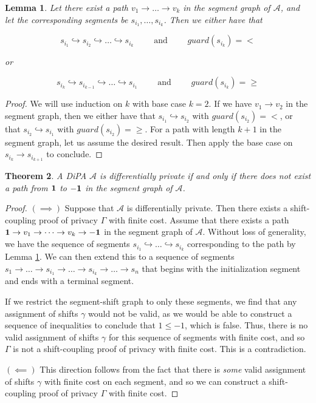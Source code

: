 \documentclass[12pt]{article}
\newtheorem{thm}{Theorem}[section]
\newtheorem{lemma}[thm]{Lemma}
\theoremstyle{definition}
\begin{document}
\begin{lemma}
    \label{lemma:segpath}
    Let there exist a path $v_1 \to \dots \to v_k$ in the segment graph of $\mathcal{A}$, and let the corresponding segments be $s_{i_1}, \dots, s_{i_k}$. Then we either have that 
    
    \[s_{i_1} \hookrightarrow s_{i_2} \hookrightarrow \dots \hookrightarrow s_{i_k} \qquad \text{ and } \qquad guard(s_{i_k}) = <\]
    
    or 
    
    \[s_{i_k} \hookrightarrow s_{i_{k - 1}} \hookrightarrow \dots \hookrightarrow s_{i_1} \qquad \text{ and } \qquad guard(s_{i_k}) = \geq\]
\end{lemma}

\begin{proof}
    We will use induction on $k$ with base case $k = 2$. If we have $v_1 \to v_2$ in the segment  graph, then we either have that $s_{i_1} \hookrightarrow s_{i_2}$ with $guard(s_{i_2}) = <$, or that $s_{i_2} \hookrightarrow s_{i_1}$ with $guard(s_{i_2}) = \geq$. For a path with length $k + 1$ in the segment  graph, let us assume the desired result. Then apply the base case on $s_{i_{k}} \to s_{i_{k + 1}}$ to conclude. 
\end{proof}

\begin{thm}
    \label{theorem:decide_privacy}
    A DiPA $\mathcal{A}$ is differentially private if and only if there does not exist a path from $\bf 1$ to $\bf -1$ in the segment graph of $\mathcal{A}$.
\end{thm}

\begin{proof}
    $(\implies)$ Suppose that $\mathcal{A}$ is differentially private. Then there exists a shift-coupling proof of privacy $\Gamma$ with finite cost. Assume that there exists a path ${\bf 1} \to v_1 \to \dots \to v_k \to {\bf -1}$ in the segment graph of $\mathcal{A}$. 
    Without loss of generality, we have the sequence of segments $s_{i_1} \hookrightarrow \dots \hookrightarrow s_{i_k}$ corresponding to the path by Lemma \ref{lemma:segpath}. We can then extend this to a sequence of segments $s_1 \to \dots \to s_{i_1} \to \dots \to s_{i_k} \to \dots \to s_n$ that begins with the initialization segment and ends with a terminal segment. 

    If we restrict the segment-shift graph to only these segments, we find that any assignment of shifts $\gamma$ would not be valid, as we would be able to construct a sequence of inequalities to conclude that $1 \leq -1$, which is false. Thus, there is no valid assignment of shifts $\gamma$ for this sequence of segments with finite cost, and so $\Gamma$ is not a shift-coupling proof of privacy with finite cost. This is a contradiction.

    $(\impliedby)$ This direction follows from the fact that there is \textit{some} valid assignment of shifts $\gamma$ with finite cost on each segment, and so we can construct a shift-coupling proof of privacy $\Gamma$ with finite cost.
\end{proof}
\end{document}
